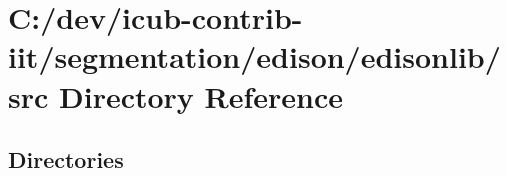 \section{C\+:/dev/icub-\/contrib-\/iit/segmentation/edison/edisonlib/src Directory Reference}
\label{dir_85f1b352ca315202a49b20057897214f}
\subsection*{Directories}
\begin{DoxyCompactItemize}
\end{DoxyCompactItemize}
